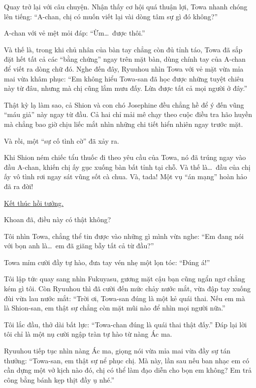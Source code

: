 \documentclass[../main.tex]{subfiles}
\begin{document}
Quay trở lại với câu chuyện. Nhận thấy cơ hội quá thuận lợi, Towa nhanh chóng lên tiếng: ``A-chan, chị có muốn viết lại vài dòng tâm sự gì đó không?''

A-chan với vẻ mệt mỏi đáp: ``Ừm\dots\ được thôi.''

Và thế là, trong khi chủ nhân của bàn tay chẳng còn đủ tỉnh táo, Towa đã sắp đặt hết tất cả các ``bằng chứng'' ngay trên mặt bàn, dùng chính tay của A-chan để viết ra dòng chữ đó. Nghe đến đây, Ryuuhou nhìn Towa với vẻ mặt vừa mỉa mai vừa khâm phục: ``Em không hiểu Towa-san đã học được những tuyệt chiêu này từ đâu, nhưng mà chị cũng lắm mưu đấy. Lừa được tất cả mọi người ở đây.''

Thật kỳ lạ làm sao, cả Shion và con chó Josephine đều chẳng hề để ý đến vũng ``máu giả'' này ngay từ đầu. Cả hai chỉ mải mê chạy theo cuộc điều tra hão huyền mà chẳng bao giờ chịu liếc mắt nhìn những chi tiết hiển nhiên ngay trước mặt.

Và rồi, một ``sự cố tình cờ'' đã xảy ra.

Khi Shion ném chiếc tẩu thuốc đi theo yêu cầu của Towa, nó đã trúng ngay vào đầu A-chan, khiến chị ấy gục xuống bàn bất tỉnh tại chỗ. Và thế là\dots\ đầu của chị ấy vô tình rơi ngay sát vũng sốt cà chua. Và, tada! Một vụ ``án mạng'' hoàn hảo đã ra đời!

\begin{center}
  \uline{Kết thúc hồi tưởng.}
\end{center}

Khoan đã, điều này có thật không?

Tôi nhìn Towa, chẳng thể tin được vào những gì mình vừa nghe: ``Em đang nói với bọn anh là\dots\ em đã giăng bẫy tất cả từ đầu?''

Towa mỉm cười đầy tự hào, đưa tay vén nhẹ một lọn tóc: ``Đúng á!''

Tôi lập tức quay sang nhìn Fukuyasu, gương mặt cậu bạn cũng ngẩn ngơ chẳng kém gì tôi. Còn Ryuuhou thì đã cười đến mức chảy nước mắt, vừa đập tay xuống đùi vừa lau nước mắt: ``Trời ơi, Towa-san đúng là một kẻ quái thai. Nếu em mà là Shion-san, em thật sự chẳng còn mặt mũi nào để nhìn mọi người nữa.''

Tôi lắc đầu, thở dài bất lực: ``Towa-chan đúng là quái thai thật đấy.'' Đáp lại lời tôi chỉ là một nụ cười ngập tràn tự hào từ nàng Ác ma.

Ryuuhou tiếp tục nhìn nàng Ác ma, giọng nói vừa mỉa mai vừa đầy sự tán thưởng: ``Towa-san, em thật sự nể phục chị. Mà này, lần sau nếu ban nhạc em có cần dựng một vở kịch nào đó, chị có thể làm đạo diễn cho bọn em không? Em trả công bằng bánh kẹp thịt đầy ụ nhé.''
\end{document}
